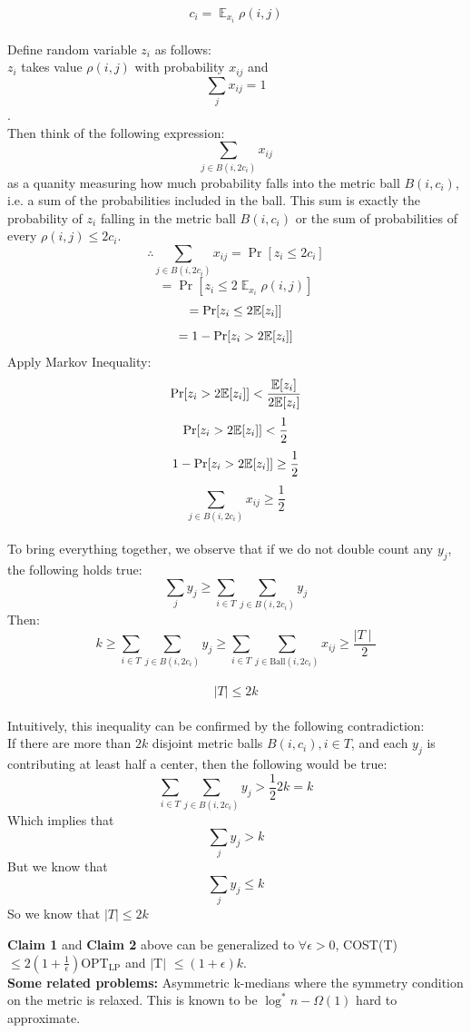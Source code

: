 \noindent $$ c_i = \displaystyle \mathop{\mathbb{E}}_{x_i}\rho(i,j) $$ \\
Define random variable $z_i$ as follows: \\
$z_i$ takes value $\rho(i,j)$ with probability $x_{ij}$ and $$\sum\limits_{j}x_{ij} = 1 $$.\\

\noindent Then think of the following expression: 
$$ \sum\limits_{j \in B(i, 2c_i)}x_{ij} $$ 
as a quanity measuring how much probability falls into the metric ball $B(i, c_i)$, i.e. a sum of the probabilities included in the ball. This sum is exactly the probability of $z_i$ falling in the metric ball $B(i,c_i)$ or the sum of probabilities of every $\rho(i,j) \leq 2c_i$. \\

\noindent $$ \therefore \sum\limits_{j \in B(i, 2c_i)}x_{ij} = \Pr [z_i \leq 2c_i] $$
$$ = \Pr [z_i \leq 2\displaystyle \mathop{\mathbb{E}}_{x_i}\rho(i,j)] $$
$$ = \Pr [z_i \leq 2\mathbb{E}[z_i]] $$
$$ = 1 - \Pr [z_i > 2\mathbb{E}[z_i]] $$ 
Apply Markov Inequality: \\

\noindent $$ \Pr [z_i> 2\mathbb{E}[z_i]] < \frac{\mathbb{E}[z_i]}{2\mathbb{E}[z_i]}  $$ 
$$ \Pr [z_i> 2\mathbb{E}[z_i]] < \frac{1}{2} $$
$$ 1 - \Pr [z_i > 2\mathbb{E}[z_i]] \geq \frac{1}{2} $$ 
$$ \sum\limits_{j \in B(i, 2c_i)}x_{ij} \geq \frac{1}{2} $$ \\
To bring everything together, we observe that if we do not double count any $y_j$, the following holds true: 
$$ \sum\limits_{j}y_j \geq \sum\limits_{i \in T}\sum\limits_{j \in B(i, 2c_i)}y_j $$ 
Then: 
$$k \geq \sum\limits_{i \in T}\sum\limits_{j \in B(i, 2c_i)}y_j \geq \sum\limits_{i \in T}\sum_{j \in \text{Ball}(i, 2c_i)}x_{ij} \geq \frac{\mid T \mid}{2}$$ \\
$$\mid T \mid \leq 2k$$\\
\noindent Intuitively, this inequality can be confirmed by the following contradiction: \\
If there are more than $2k$ disjoint metric balls $B(i, c_i), i \in T$, and each $y_j$ is contributing at least half a center, then the following would be true: \\
$$\sum\limits_{i \in T}\sum\limits_{j \in B(i, 2c_i)}y_j > \frac{1}{2}2k = k$$
Which implies that 
$$\sum\limits_{j}y_j > k$$
But we know that $$\sum\limits_{j}y_j \leq k$$
So we know that $\mid T \mid \leq 2k$

\noindent \textbf{Claim 1} and \textbf{Claim 2} above can be generalized to $\forall \epsilon > 0$, COST(T)$\leq2(1+\frac{1}{\epsilon})$OPT$_\text{LP}$ and $\mid $T$\mid$ $\leq (1+\epsilon)k$. \\

\noindent\textbf{Some related problems:} Asymmetric k-medians where the symmetry condition on the metric is relaxed. This is known to be $\log^*n - \Omega(1)$ hard to approximate. \\
